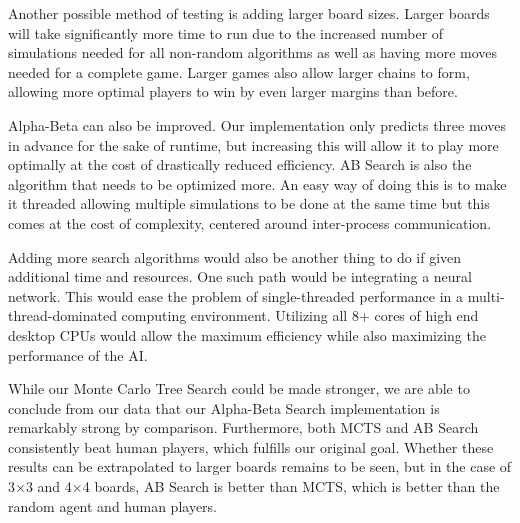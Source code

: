 \documentclass[12pt]{article}
\begin{document}
    Another possible method of testing is adding larger board sizes. Larger boards will take significantly more time to run due to the increased number of simulations needed for all non-random algorithms as well as having more moves needed for a complete game. Larger games also allow larger chains to form, allowing more optimal players to win by even larger margins than before.
    
    Alpha-Beta can also be improved. Our implementation only predicts three moves in advance for the sake of runtime, but increasing this will allow it to play more optimally at the cost of drastically reduced efficiency. AB Search is also the algorithm that needs to be optimized more. An easy way of doing this is to make it threaded allowing multiple simulations to be done at the same time but this comes at the cost of complexity, centered around inter-process communication.
    
    Adding more search algorithms would also be another thing to do if given additional time and resources. One such path would be integrating a neural network. This would ease the problem of single-threaded performance in a multi-thread-dominated computing environment. Utilizing all 8+ cores of high end desktop CPUs would allow the maximum efficiency while also maximizing the performance of the AI.
    
    While our Monte Carlo Tree Search could be made stronger, we are able to conclude from our data that our Alpha-Beta Search implementation is remarkably strong by comparison. Furthermore, both MCTS and AB Search consistently beat human players, which fulfills our original goal. Whether these results can be extrapolated to larger boards remains to be seen, but in the case of 3\(\times\)3 and 4\(\times\)4 boards, AB Search is better than MCTS, which is better than the random agent and human players. 
    
    
    
\end{document}

